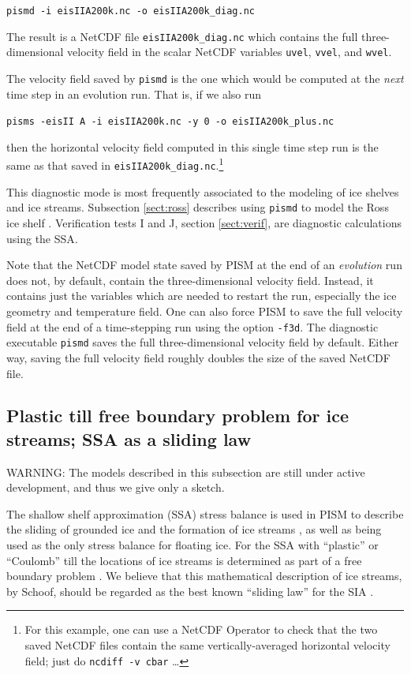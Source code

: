 \documentclass[11pt,final]{amsart}
\renewcommand{\t}[1]{\texttt{#1}}
\newcommand{\pismoptionindex}[1]{\index{options for PISM (and PETSc)!\texttt{-#1}}}
\newcommand{\intextoption}[1]{\texttt{-#1}\pismoptionindex{#1}}
\begin{document}
\verb|pismd -i eisIIA200k.nc -o eisIIA200k_diag.nc|

\noindent The result is a NetCDF file \verb|eisIIA200k_diag.nc| which contains the full three-dimensional velocity field in the scalar NetCDF variables \verb|uvel|, \verb|vvel|, and \verb|wvel|.

The velocity field saved by \verb|pismd| is the one which would be computed at the \emph{next} time step in an evolution run.  That is, if we also run

\verb|pisms -eisII A -i eisIIA200k.nc -y 0 -o eisIIA200k_plus.nc|

\noindent then the horizontal velocity field computed in this single time step run is the same as that saved in \verb|eisIIA200k_diag.nc|.\footnote{For this example, one can use a NetCDF Operator to check that the two saved NetCDF files contain the same vertically-averaged horizontal velocity field; just do \t{ncdiff -v cbar} \dots}

This diagnostic mode is most frequently associated to the modeling of ice shelves and ice streams.  Subsection \ref{sect:ross} describes using \verb|pismd| to model the Ross ice shelf \cite{MacAyealetal}.  Verification tests I and J, section \ref{sect:verif}, are diagnostic calculations using the SSA.

Note that the NetCDF model state saved by PISM at the end of an \emph{evolution} run does not, by default, contain the three-dimensional velocity field.  Instead, it contains just the variables which are needed to restart the run, especially the ice geometry and temperature field.  One can also force PISM to save the full velocity field at the end of a time-stepping run using the option \intextoption{f3d}.  The diagnostic executable \verb|pismd| saves the full three-dimensional velocity field by default.  Either way, saving the full velocity field roughly doubles the size of the saved NetCDF file.


\subsection{Plastic till free boundary problem for ice streams; SSA as a sliding law}  \label{subsect:plastic}
WARNING: The models described in this subsection are still under active development, and thus we give only a sketch.

The shallow shelf approximation (SSA) stress balance is used in PISM to describe the sliding of grounded ice and the formation of ice streams \cite{BBssasliding}, as well as being used as the only stress balance for floating ice.  For the SSA with ``plastic'' or ``Coulomb'' till the locations of ice streams is determined as part of a free boundary problem \cite{SchoofStream}.  We believe that this mathematical description of ice streams, by Schoof, should be regarded as the best known ``sliding law'' for the SIA \cite{BBssasliding}.
\end{document}
